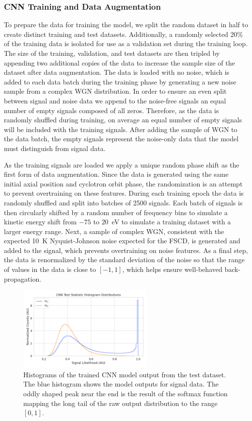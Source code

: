 \subsubsection{CNN Training and Data Augmentation}
To prepare the data for training the model, we split the random dataset in half to create distinct training and test datasets. Additionally, a randomly selected 20\% of the training data is isolated for use as a validation set during the training loop. The size of the training, validation, and test datasets are then tripled by appending two additional copies of the data to increase the sample size of the dataset after data augmentation. The data is loaded with no noise, which is added to each data batch during the training phase by generating a new noise sample from a complex WGN distribution. In order to ensure an even split between signal and noise data we append to the noise-free signals an equal number of empty signals composed of all zeros. Therefore, as the data is randomly shuffled during training, on average an equal number of empty signals will be included with the training signals. After adding the sample of WGN to the data batch, the empty signals represent the noise-only data that the model must distinguish from signal data. 

As the training signals are loaded we apply a unique random phase shift as the first form of data augmentation. Since the data is generated using the same initial axial position and cyclotron orbit phase, the randomization is an attempt to prevent overtraining on these features. During each training epoch the data is randomly shuffled and split into batches of 2500 signals. Each batch of signals is then circularly shifted by a random number of frequency bins to simulate a kinetic energy shift from $-75$ to $20$~eV to simulate a training dataset with a larger energy range. Next, a sample of complex WGN, consistent with the expected 10~K Nyquist-Johnson noise  expected for the FSCD, is generated and added to the signal, which prevents overtraining on noise features. As a final step, the data is renormalized by the standard deviation of the noise so that the range of values in the data is close to $[-1,1]$, which helps ensure well-behaved back-propagation.

\begin{figure}[htbp]
    \centering
    \includegraphics[width=0.6\textwidth]{figs/Chapter-4/230324_cnn_test_stat_hist.png}
    \caption{Histograms of the trained CNN model output from the test dataset. The blue histogram shows the model outputs for signal data. The oddly shaped peak near the end is the result of the softmax function mapping the long tail of the raw output distribution to the range $[0,1]$. }
    \label{fig:cnn_histogram}
\end{figure}

